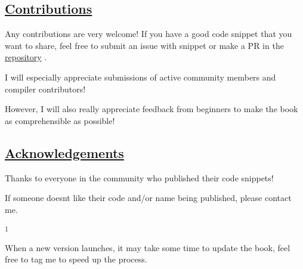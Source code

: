 \subsection{\texorpdfstring{\hyperref[contributions]{Contributions}}{Contributions}}\label{contributions}

Any contributions are very welcome! If you have a good code snippet that
you want to share, feel free to submit an issue with snippet or make a
PR in the
\href{https://github.com/sitandr/typst-examples-book}{repository} .

I will especially appreciate submissions of active community members and
compiler contributors!

However, I will also really appreciate feedback from beginners to make
the book as comprehensible as possible!

\subsection{\texorpdfstring{\hyperref[acknowledgements]{Acknowledgements}}{Acknowledgements}}\label{acknowledgements}

Thanks to everyone in the community who published their code snippets!

If someone doesn\textquotesingle t like their code and/or name being
published, please contact me.

\label{1}
\textsuperscript{1}

When a new version launches, it may take some time to update the book,
feel free to tag me to speed up the process.


